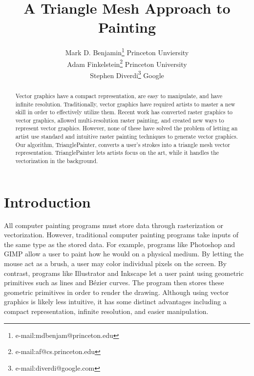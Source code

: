 \documentclass[review]{acmsiggraph}
\title{A Triangle Mesh Approach to Painting}
\author{Mark D. Benjamin\thanks{e-mail:mdbenjam@princeton.edu} \hspace{10 pt} Princeton Unviersity\\ Adam Finkelstein\thanks{e-mail:af@cs.princeton.edu} \hspace{10 pt} Princeton University\\ Stephen Diverdi\thanks{e-mail:diverdi@google.com} \hspace{10 pt} Google}
\begin{document}

\maketitle

\begin{abstract}
Vector graphics have a compact representation, are easy to manipulate, and have infinite resolution.
Traditionally, vector graphics have required artists to master a new skill in order to effectively utilize
them. Recent work has converted raster graphics to vector graphics, allowed multi-resolution raster painting,
and created new ways to represent vector graphics. However, none of these have solved the problem of
letting an artist use standard and intuitive raster painting techniques to generate vector graphics.
Our algorithm, TrianglePainter, converts a user's strokes into a triangle mesh vector representation. 
TrianglePainter lets artists focus on the art, while it handles the vectorization in the background.

\end{abstract}

\begin{CRcatlist}
\end{CRcatlist}

\keywordlist


\TOGlinkslist


\copyrightspace

\section{Introduction}

All computer painting programs must store data through rasterization or vectorization. 
However, traditional computer painting programs take inputs of the same type as the stored data. 
For example, programs like Photoshop and GIMP
allow a user to paint how he would on a physical medium. By letting the mouse act as
a brush, a user may color individual pixels on the screen. By contrast, programs like 
Illustrator and Inkscape let a user paint
using geometric primitives such as lines and B\'{e}zier curves. The program then stores
these geometric primitives in order to render the drawing. Although using vector graphics
is likely less intuitive, it has some distinct advantages including a compact
representation, infinite resolution, and easier manipulation.
\end{document}
